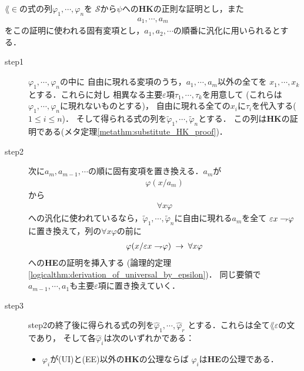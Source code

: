 	\begin{metaprf}
		$\lang{\in}$の式の列$\varphi_{1},\cdots,\varphi_{n}$を
		$\mathscr{S}$から$\psi$への{\bf HK}の正則な証明とし，また
		\begin{align}
			a_{1},\cdots,a_{m}
		\end{align}
		をこの証明に使われる固有変項とし，$a_{1},a_{2},\cdots$の順番に汎化に用いられるとする．
	
		\begin{description}
			\item[step1]
				$\varphi_{1},\cdots,\varphi_{n}$の中に
				自由に現れる変項のうち，$a_{1},\cdots,a_{m}$以外の全てを
				$x_{1},\cdots,x_{k}$とする．これらに対し
				相異なる主要$\varepsilon$項$\tau_{1},\cdots,\tau_{k}$を用意して
				(これらは$\varphi_{1},\cdots,\varphi_{n}$に現れないものとする)，
				自由に現れる全ての$x_{i}$に$\tau_{i}$を代入する($1 \leq i \leq n$)．
				そして得られる式の列を$\tilde{\varphi}_{1},\cdots,\tilde{\varphi}_{n}$とする．
				この列は{\bf HK}の証明である(メタ定理\ref{metathm:substitute_HK_proof})．
				
			\item[step2]
				次に$a_{m},a_{m-1},\cdots$の順に固有変項を置き換える．$a_{m}$が
				\begin{align}
					\varphi(x/a_{m})
				\end{align}
				から
				\begin{align}
					\forall x \varphi
				\end{align}
				への汎化に使われているなら，$\tilde{\varphi}_{1},\cdots,
				\tilde{\varphi}_{n}$に自由に現れる$a_{m}$を全て
				$\varepsilon x \rightharpoondown\hspace{-0.25em} \varphi$に置き換えて，列の$\forall x \varphi$の前に
				\begin{align}
					\varphi(x/\varepsilon x \rightharpoondown\hspace{-0.25em} \varphi) 
					\hspace{0.25em}\rightarrow\hspace{0.25em} \forall x \varphi
				\end{align}
				への{\bf HE}の証明を挿入する
				(論理的定理\ref{logicalthm:derivation_of_universal_by_epsilon})．
				同じ要領で$a_{m-1},\cdots,a_{1}$も主要$\varepsilon$項に置き換えていく．
				
			\item[step3]
				step2の終了後に得られる式の列を$\hat{\varphi}_{1},\cdots,\hat{\varphi}_{r}$
				とする．これらは全て$\lang{\varepsilon}$の文であり，
				そして各$\hat{\varphi}_{i}$は次のいずれかである：
				\begin{itemize}
					\item $\varphi_{i}$が(UI)と(EE)以外の{\bf HK}の公理ならば
						$\hat{\varphi}_{i}$は{\bf HE}の公理である．
						

\end{itemize}
\end{description}
\end{metaprf}
